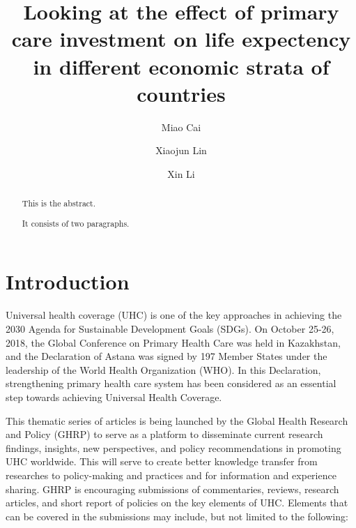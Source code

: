 \documentclass[]{elsarticle} %
\begin{document}
\begin{frontmatter}

  \title{Looking at the effect of primary care investment on life expectency in different economic strata of countries}
    \author[SLU]{Miao Cai}
  
    \author[SCU]{Xiaojun Lin}
    \author[WHU]{Xin Li}
  
      \address[SLU]{Saint Louis University, Saint Louis, MO, 63108}
    \address[SCU]{Sichuan University, Chengdu, Sichuan, China}
    \address[WHU]{Wuhan University, Wuhan, Hubei, China}
  
  \begin{abstract}
  This is the abstract.
  
  It consists of two paragraphs.
  \end{abstract}
  
 \end{frontmatter}

\newcommand{\blandscape}{\begin{landscape}}
\newcommand{\elandscape}{\end{landscape}}

\hypertarget{introduction}{%
\section{Introduction}\label{introduction}}

Universal health coverage (UHC) is one of the key approaches in achieving the 2030 Agenda for Sustainable Development Goals (SDGs). On October 25-26, 2018, the Global Conference on Primary Health Care was held in Kazakhstan, and the Declaration of Astana was signed by 197 Member States under the leadership of the World Health Organization (WHO). In this Declaration, strengthening primary health care system has been considered as an essential step towards achieving Universal Health Coverage.

This thematic series of articles is being launched by the Global Health Research and Policy (GHRP) to serve as a platform to disseminate current research findings, insights, new perspectives, and policy recommendations in promoting UHC worldwide. This will serve to create better knowledge transfer from researches to policy-making and practices and for information and experience sharing. GHRP is encouraging submissions of commentaries, reviews, research articles, and short report of policies on the key elements of UHC. Elements that can be covered in the submissions may include, but not limited to the following:
\end{document}
